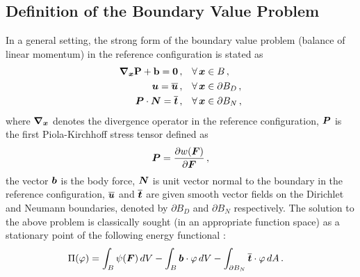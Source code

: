 \subsection{Definition of the Boundary Value Problem}\label{subsec:def-NBVP}

In a general setting, the strong form of the boundary value problem (balance of linear momentum) in the reference configuration is stated as \cite{wriggers2008nonlinear}
\begin{align}
    \boldsymbol{\nabla}_{\boldsymbol{x}} \bf{P} + \bf{b}  = {\bf{0}}\,,& \quad \forall\,\boldsymbol{x} \in {B}\,, \label{eq: stress divergence}\\
    \boldsymbol{u} = \overline{\boldsymbol{u}}\,,& \quad \forall\, \boldsymbol{x} \in \partial B_D\,,\\
    \boldsymbol{P} \cdot \boldsymbol{N} = \overline{\boldsymbol{t}}\,,& \quad \forall\, \boldsymbol{x} \in \partial B_N\,,
\end{align}
where $\boldsymbol{\nabla}_{\boldsymbol{x}}$ denotes the divergence operator in the reference configuration, $\boldsymbol{P}$ is the first Piola-Kirchhoff stress tensor defined as
\begin{equation}
    \boldsymbol{P} = \displaystyle{\frac{\partial w(\boldsymbol{F})}{\partial \boldsymbol{F}}}\,,
\end{equation}
the vector $\boldsymbol{b}$ is the body force, $\boldsymbol{N}$ is unit vector normal to the boundary in the reference configuration, $\overline{\boldsymbol{u}}$ and $\overline{\boldsymbol{t}}$ are given smooth vector fields on the Dirichlet and Neumann boundaries, denoted by $\partial B_D$ and $\partial B_N$ respectively. The solution to the above problem is classically sought (in an appropriate function space) as a stationary point of the following energy functional \cite{wriggers2008nonlinear}:
\begin{align}
    \Pi(\varphi) &= \int_B \psi(\boldsymbol{F}) \, dV - \int_{B} \boldsymbol{b} \cdot \varphi\,dV - \int_{\partial B_N} \overline{\boldsymbol{t}} \cdot \varphi\,dA\,.
\end{align}


